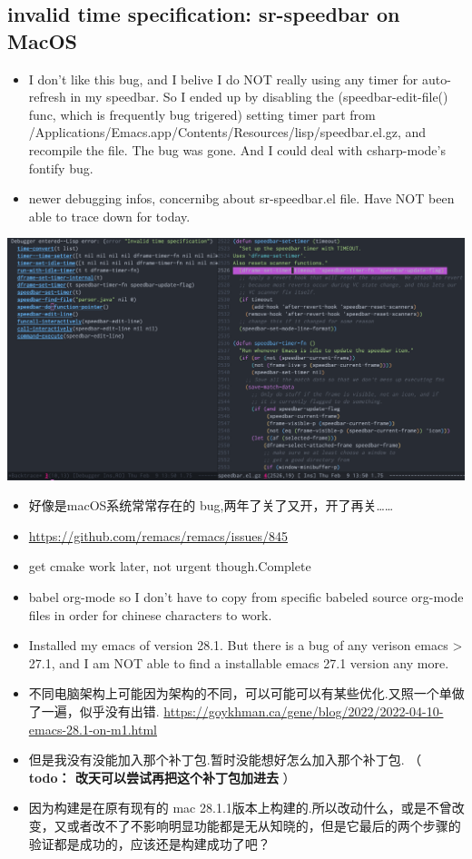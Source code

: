 \documentclass[9pt, b5paper]{article}
\begin{document}
\subsection{invalid time specification: sr-speedbar on MacOS}
\label{sec-1-8}
\begin{itemize}
\item I don't like this bug, and I belive I do NOT really using any timer for auto-refresh in my speedbar. So I ended up by disabling the (speedbar-edit-file() func, which is frequently bug trigered) setting timer part from /Applications/Emacs.app/Contents/Resources/lisp/speedbar.el.gz, and recompile the file. The bug was gone. And I could deal with csharp-mode's fontify bug.
\item newer debugging infos, concernibg about sr-speedbar.el file. Have NOT been able to trace down for today.
\end{itemize}

\includegraphics[width=.9\linewidth]{./pic/readme_20230209_135039.png}
\begin{itemize}
\item 好像是macOS系统常常存在的 bug,两年了关了又开，开了再关\ldots{}\ldots{}
\item \url{https://github.com/remacs/remacs/issues/845}
\item get cmake work later, not urgent though.Complete
\item babel org-mode so I don't have to copy from specific babeled source org-mode files in order for chinese characters to work.
\item Installed my emacs of version 28.1. But there is a bug of any verison emacs > 27.1, and I am NOT able to find a installable emacs 27.1 version any more.
\item 不同电脑架构上可能因为架构的不同，可以可能可以有某些优化.又照一个单做了一遍，似乎没有出错. \url{https://goykhman.ca/gene/blog/2022/2022-04-10-emacs-28.1-on-m1.html}
\item 但是我没有没能加入那个补丁包.暂时没能想好怎么加入那个补丁包. （ \textbf{todo： 改天可以尝试再把这个补丁包加进去} ）
\item 因为构建是在原有现有的 mac 28.1.1版本上构建的.所以改动什么，或是不曾改变，又或者改不了不影响明显功能都是无从知晓的，但是它最后的两个步骤的验证都是成功的，应该还是构建成功了吧？
\end{itemize}
\end{document}
